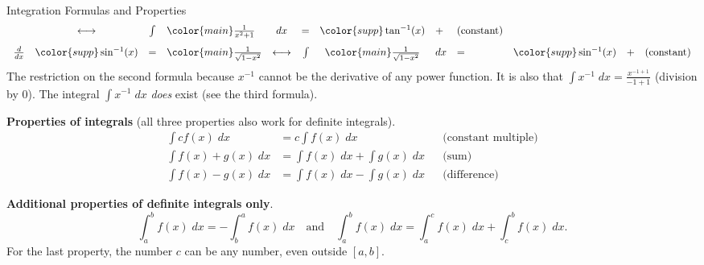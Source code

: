 \documentclass[../main.tex]{subfiles}
\begin{document}
\begin{lesson}{Integration Formulas and Properties}
\[\begin{array}{rcclcrclllcl}
                   & \longleftrightarrow 
                   & \int & {\color{main} \frac{1}{x^{2} + 1}} & dx &=& {\color{supp} \arctan(x)} 
                   &+& (\text{constant}) \\[2ex]
      \frac{d}{dx} & {\color{supp} \arcsin(x)} &=& {\color{main} \frac{1}{\sqrt{1 - x^{2}}}}
                   & \longleftrightarrow 
                   & \int & {\color{main} \frac{1}{\sqrt{1 - x^{2}}}} & dx &=& {\color{supp} \arcsin(x)} 
                   &+& (\text{constant})
    \end{array}
  \]
  {\footnotesize \faExclamationTriangle{} The restriction  on the second formula  because \(x^{-1}\) cannot be the derivative of any power function. It is also  that \(\textstyle \int x^{-1} \;dx = \frac{x^{-1 + 1}}{-1 + 1}\) (division by \(0\)). The integral \(\textstyle \int x^{-1} \;dx\) \emph{does} exist (see the third formula).}

  \textbf{Properties of integrals} (all three properties also work for definite integrals).
  \begin{align*}
    \int c f(x) \;dx 
    &= c \int f(x) \;dx && \text{(constant multiple)}\\
    \int f(x) + g(x) \;dx 
    &= \int f(x) \;dx + \int g(x) \;dx && \text{(sum)}\\
    \int f(x) - g(x) \;dx 
    &= \int f(x) \;dx - \int g(x) \;dx && \text{(difference)}
  \end{align*}

  \textbf{Additional properties of definite integrals only}.
  \[
    \int_{a}^{b} f(x) \;dx = - \int_{b}^{a} f(x) \;dx 
    \quad\text{and}\quad
    \int_{a}^{b} f(x) \;dx = \int_{a}^{c} f(x) \;dx + \int_{c}^{b} f(x) \;dx.
  \]
  For the last property, the number \(c\) can be any number, even outside \([a,b]\).


\end{lesson}
\end{document}
